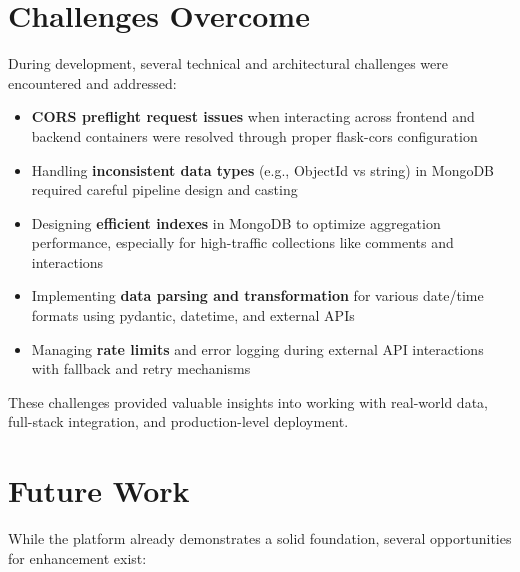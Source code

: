 \section{Challenges Overcome}\label{sec:challenges-overcome}

During development, several technical and architectural challenges were encountered and addressed:

\begin{itemize}
    \item \textbf{CORS preflight request issues} when interacting across frontend and backend containers were resolved through proper flask-cors configuration
    \item Handling \textbf{inconsistent data types} (e.g., ObjectId vs string) in MongoDB required careful pipeline design and casting
    \item Designing \textbf{efficient indexes} in MongoDB to optimize aggregation performance, especially for high-traffic collections like comments and interactions
    \item Implementing \textbf{data parsing and transformation} for various date/time formats using pydantic, datetime, and external APIs
    \item Managing \textbf{rate limits} and error logging during external API interactions with fallback and retry mechanisms
\end{itemize}

These challenges provided valuable insights into working with real-world data, full-stack integration, and production-level deployment.


\section{Future Work}\label{sec:future-work}

While the platform already demonstrates a solid foundation, several opportunities for enhancement exist:


